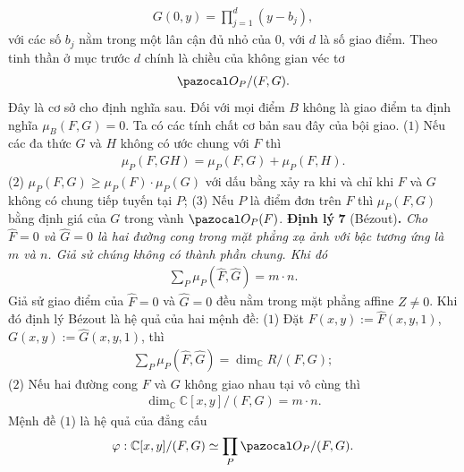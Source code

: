 \begin{multicols}{2}
	\begin{align*}
		G(0,y)=\prod_{j=1}^d(y-b_j),
	\end{align*}
	với các số $b_j$ nằm trong một lân cận đủ nhỏ của $0$, với $d$ là số giao điểm. Theo tinh thần ở mục trước $d$ chính là chiều của không gian véc tơ
	\begin{align*}
		\pazocal O_P/(F,G).
	\end{align*}
	Đây là cơ sở cho định nghĩa sau.
	\vskip 0.2cm
	\vskip 0.05cm
	Đối với mọi điểm $B$ không là giao điểm ta định nghĩa
	$\mu_B(F,G)=0.$ 
	Ta có các tính  chất cơ bản sau đây của bội giao. 
	\vskip 0.1cm
	($1$) Nếu các đa thức $G$ và $H$ không có ước chung với $F$ thì
	\setlength{\abovedisplayskip}{7pt}
	\setlength{\belowdisplayskip}{7pt} 
	\begin{align*}
		\mu_P(F,GH)=\mu_P(F,G)+\mu_P(F,H).
	\end{align*}
	($2$) $\mu_P(F,G)\geq \mu_P(F)\cdot \mu_P(G)$ với dấu bằng xảy ra khi và chỉ khi $F$ và $G$ không có chung tiếp tuyến tại $P$;
	\vskip 0.1cm
	($3$) Nếu $P$ là điểm đơn trên $F$  thì $\mu_P(F,G)$ bằng định giá của $G$ trong vành $\pazocal O_P(F)$. 
	\vskip 0.1cm
	\textbf{\color{duongvaotoanhoc}Định lý} $\pmb{7}$ (Bézout)\textbf{\color{duongvaotoanhoc}.} \textit{Cho $\widehat F=0$ và $\widehat G=0$ là hai đường cong  trong mặt phẳng xạ ảnh với bậc tương ứng là $m$ và $n$. Giả sử chúng không có thành phần chung. Khi đó}
	\begin{align*}
		\sum_P\mu_P(\widehat F,\widehat G)=m\cdot n.
	\end{align*}
	Giả sử giao điểm của  $\widehat F=0$ và $\widehat G=0$ đều nằm trong mặt phẳng affine $Z\neq 0$. 
	Khi đó  định lý Bézout là hệ quả của hai mệnh đề:
	\vskip 0.1cm
	($1$) Đặt $F(x,y):=\widehat F(x,y,1)$, $G(x,y):=\widehat G(x,y,1)$, thì 
		\begin{align*}
			\sum_P\mu_P(\widehat F,\widehat G)=\dim_{\mathbb C}R/(F,G);
		\end{align*}
	($2$) Nếu hai đường cong $F$  và $G$  không giao nhau tại vô cùng thì 
		\begin{align*}
			\dim_{\mathbb C}\mathbb C[x,y]/(F,G)= m\cdot n.
		\end{align*}
	Mệnh đề ($1$) là hệ quả của đẳng cấu
	\begin{align*}
		\varphi:\mathbb C[x,y]/(F,G)\simeq \prod_P \pazocal O_P/(F,G).

\end{align*}
\end{multicols}
